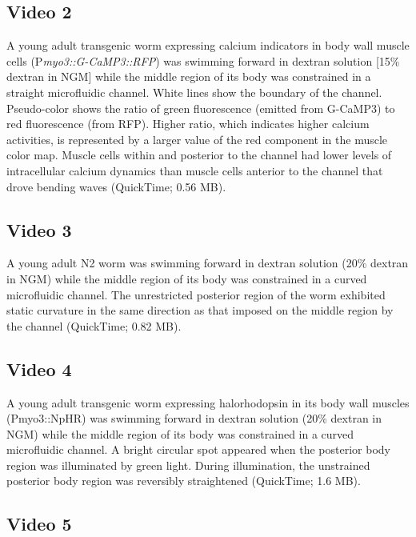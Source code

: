 \subsection{Video 2}\label{video:prop2}
 
A young adult transgenic worm expressing calcium indicators in body wall muscle cells 
(P\textit{myo3::G-CaMP3::RFP}) was swimming forward in dextran solution [15\% dextran in NGM] 
while the middle region of its body was constrained in a straight microfluidic channel. White 
lines show the boundary of the channel. Pseudo-color shows the ratio of green fluorescence 
(emitted from G-CaMP3) to red fluorescence (from RFP). Higher ratio, which indicates higher 
calcium activities, is represented by a larger value of the red component in the muscle color map. 
Muscle cells within and posterior to the channel had lower levels of intracellular calcium 
dynamics than muscle cells anterior to the channel that drove bending waves (QuickTime; 0.56 
MB).   
 
\subsection{Video 3 }\label{video:prop3}
 
A young adult N2 worm was swimming forward in dextran solution (20\% dextran in NGM) 
while the middle region of its body was constrained in a curved microfluidic channel. The 
unrestricted posterior region of the worm exhibited static curvature in the same direction as 
that imposed on the middle region by the channel (QuickTime; 0.82 MB). 
 
\subsection{Video 4 }\label{video:prop4}
 
A young adult transgenic worm  expressing halorhodopsin in its body wall muscles 
(Pmyo3::NpHR) was swimming forward in dextran solution (20\% dextran in NGM) while the 
middle region of its body was constrained in a curved microfluidic channel. A bright circular spot 
appeared when the posterior body region was illuminated by green light. During illumination, the 
unstrained posterior body region was reversibly straightened (QuickTime; 1.6 MB). 
 
\subsection{Video 5 }\label{video:prop5}
 
